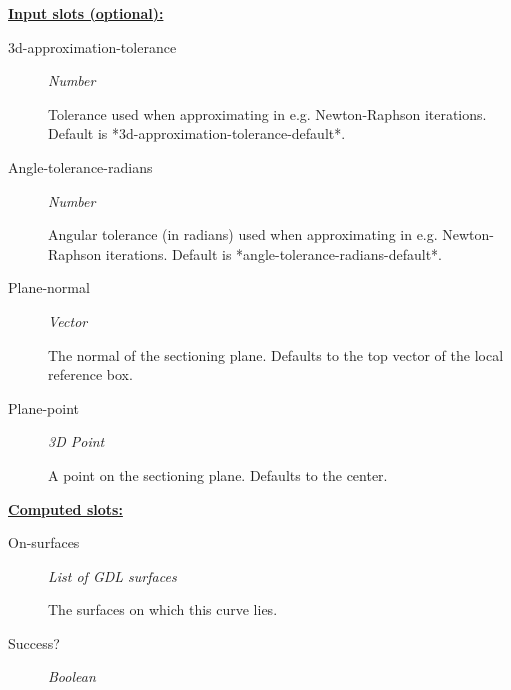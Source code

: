 \documentclass [11pt]{book}
\begin{document}
\begin{itemize}
\begin{description}
\end{description}






\textbf{
\underline{Input slots (optional):}}

\begin{description}

\item [3d-approximation-tolerance]
\emph{Number}

 Tolerance used when approximating in e.g. Newton-Raphson iterations.
Default is *3d-approximation-tolerance-default*.




\item [Angle-tolerance-radians]
\emph{Number}

 Angular tolerance (in radians) used when approximating in e.g. Newton-Raphson iterations.
Default is *angle-tolerance-radians-default*.




\item [Plane-normal]
\emph{Vector}

 The normal of the sectioning plane. Defaults to the top vector of the local reference box.




\item [Plane-point]
\emph{3D Point}

 A point on the sectioning plane. Defaults to the center.




\end{description}






\textbf{
\underline{Computed slots:}}

\begin{description}

\item [On-surfaces]
\emph{List of GDL surfaces}

 The surfaces on which this curve lies.




\item [Success?]
\emph{Boolean}


\end{description}
\end{itemize}
\end{document}
